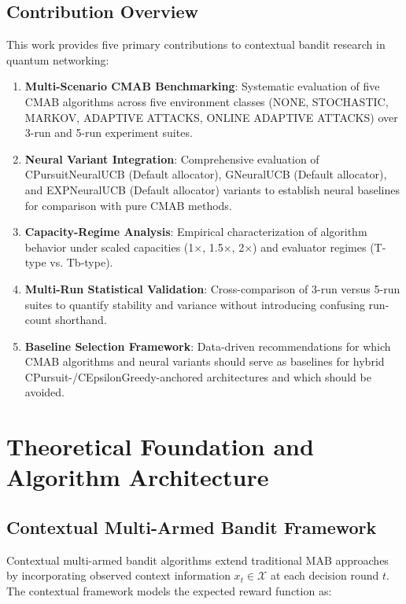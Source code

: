 \documentclass[12pt,a4paper]{article}
\begin{document}
\subsection{Contribution Overview}

This work provides five primary contributions to contextual bandit research in quantum networking:

\begin{enumerate}
\item \textbf{Multi-Scenario CMAB Benchmarking}: Systematic evaluation of five CMAB algorithms across five environment classes (NONE, STOCHASTIC, MARKOV, ADAPTIVE ATTACKS, ONLINE ADAPTIVE ATTACKS) over 3-run and 5-run experiment suites.
\item \textbf{Neural Variant Integration}: Comprehensive evaluation of CPursuitNeuralUCB (Default allocator), GNeuralUCB (Default allocator), and EXPNeuralUCB (Default allocator) variants to establish neural baselines for comparison with pure CMAB methods.
\item \textbf{Capacity-Regime Analysis}: Empirical characterization of algorithm behavior under scaled capacities (1$\times$, 1.5$\times$, 2$\times$) and evaluator regimes (T-type vs. Tb-type).
\item \textbf{Multi-Run Statistical Validation}: Cross-comparison of 3-run versus 5-run suites to quantify stability and variance without introducing confusing run-count shorthand.
\item \textbf{Baseline Selection Framework}: Data-driven recommendations for which CMAB algorithms and neural variants should serve as baselines for hybrid CPursuit-/CEpsilonGreedy-anchored architectures and which should be avoided.
\end{enumerate}

\newpage
\section{Theoretical Foundation and Algorithm Architecture}

\subsection{Contextual Multi-Armed Bandit Framework}

Contextual multi-armed bandit algorithms extend traditional MAB approaches by incorporating observed context information $x_t \in \mathcal{X}$ at each decision round $t$. The contextual framework models the expected reward function as:
\end{document}
